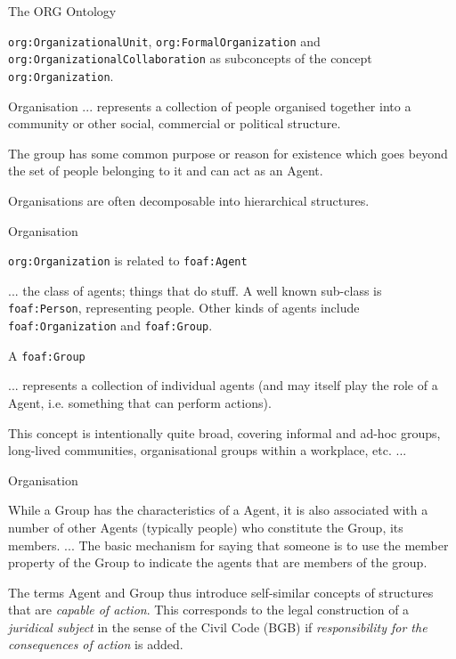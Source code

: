 \documentclass{beamer}
\begin{document}
\begin{frame}{The ORG Ontology}

  \texttt{org:OrganizationalUnit}, \texttt{org:FormalOrganization} and
  \texttt{org:OrganizationalCollaboration} as subconcepts of the concept
  \texttt{org:Organization}.

  \begin{block}{Organisation}
    ... represents a collection of people organised together into a community
    or other social, commercial or political structure.\medskip

    The group has some common purpose or reason for existence which goes
    beyond the set of people belonging to it and can act as an Agent.\medskip

    Organisations are often decomposable into hierarchical structures.
  \end{block}
\end{frame}

\begin{frame}{Organisation}

  \texttt{org:Organization} is related to \texttt{foaf:Agent}

  ... the class of agents; things that do stuff. A well known sub-class is
  \texttt{foaf:Person}, representing people. Other kinds of agents include
  \texttt{foaf:Organization} and \texttt{foaf:Group}. 

  A \texttt{foaf:Group}

  ... represents a collection of individual agents (and may itself play the
  role of a Agent, i.e. something that can perform actions).

  This concept is intentionally quite broad, covering informal and ad-hoc
  groups, long-lived communities, organisational groups within a workplace,
  etc. ...
\end{frame}

\begin{frame}{Organisation}

  While a Group has the characteristics of a Agent, it is also associated with
  a number of other Agents (typically people) who constitute the Group, its
  members. ...  The basic mechanism for saying that someone is to use the
  member property of the Group to indicate the agents that are members of the
  group.
  
  The terms Agent and Group thus introduce self-similar concepts of structures
  that are \emph{capable of action}. This corresponds to the legal
  construction of a \emph{juridical subject} in the sense of the Civil Code
  (BGB) if \emph{responsibility for the consequences of action} is added.

\end{frame}
\end{document}
